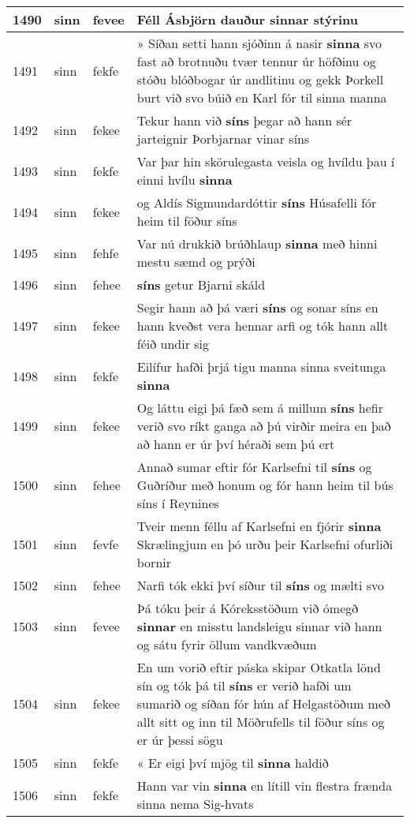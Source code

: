 \documentclass{article}
\begin{document}
\begin{longtable}{p{1cm}|p{1cm}|p{1cm}|p{13cm}}
\hline
1490&sinn&fevee&Féll Ásbjörn dauður \textbf{sinnar} stýrinu\\
\hline
1491&sinn&fekfe&» Síðan setti hann sjóðinn á nasir \textbf{sinna} svo fast að brotnuðu tvær tennur úr höfðinu og stóðu blóðbogar úr andlitinu og gekk Þorkell burt við svo búið en Karl fór til sinna manna\\
\hline
1492&sinn&fekee&Tekur hann við \textbf{síns} þegar að hann sér jarteignir Þorbjarnar vinar síns\\
\hline
1493&sinn&fekfe&Var þar hin skörulegasta veisla og hvíldu þau í einni hvílu \textbf{sinna} \\
\hline
1494&sinn&fekee&og Aldís Sigmundardóttir \textbf{síns} Húsafelli fór heim til föður síns\\
\hline
1495&sinn&fehfe&Var nú drukkið brúðhlaup \textbf{sinna} með hinni mestu sæmd og prýði\\
\hline
1496&sinn&fehee& \textbf{síns} getur Bjarni skáld\\
\hline
1497&sinn&fekee&Segir hann að þá væri \textbf{síns} og sonar síns en hann kveðst vera hennar arfi og tók hann allt féið undir sig\\
\hline
1498&sinn&fekfe&Eilífur hafði þrjá tigu manna sinna sveitunga \textbf{sinna} \\
\hline
1499&sinn&fekee&Og láttu eigi þá fæð sem á millum \textbf{síns} hefir verið svo ríkt ganga að þú virðir meira en það að hann er úr því héraði sem þú ert\\
\hline
1500&sinn&fehee&Annað sumar eftir fór Karlsefni til \textbf{síns} og Guðríður með honum og fór hann heim til bús síns í Reynines\\
\hline
1501&sinn&fevfe&Tveir menn féllu af Karlsefni en fjórir \textbf{sinna} Skrælingjum en þó urðu þeir Karlsefni ofurliði bornir\\
\hline
1502&sinn&fehee&Narfi tók ekki því síður til \textbf{síns} og mælti svo\\
\hline
1503&sinn&fevee&Þá tóku þeir á Kóreksstöðum við ómegð \textbf{sinnar} en misstu landsleigu sinnar við hann og sátu fyrir öllum vandkvæðum\\
\hline
1504&sinn&fekee&En um vorið eftir páska skipar Otkatla lönd sín og tók þá til \textbf{síns} er verið hafði um sumarið og síðan fór hún af Helgastöðum með allt sitt og inn til Möðrufells til föður síns og er úr þessi sögu\\
\hline
1505&sinn&fekfe&« Er eigi því mjög til \textbf{sinna} haldið\\
\hline
1506&sinn&fekfe&Hann var vin \textbf{sinna} en lítill vin flestra frænda sinna nema Sig-hvats\\

\end{longtable}
\end{document}
